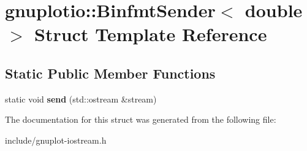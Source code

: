 \hypertarget{structgnuplotio_1_1BinfmtSender_3_01double_01_4}{}\section{gnuplotio\+:\+:Binfmt\+Sender$<$ double $>$ Struct Template Reference}
\label{structgnuplotio_1_1BinfmtSender_3_01double_01_4}
\subsection*{Static Public Member Functions}
\begin{DoxyCompactItemize}
\item 
\mbox{\label{structgnuplotio_1_1BinfmtSender_3_01double_01_4_a455b75492a6a86398374d14a2bfc7238}} 
static void {\bfseries send} (std\+::ostream \&stream)
\end{DoxyCompactItemize}


The documentation for this struct was generated from the following file\+:\begin{DoxyCompactItemize}
\item 
include/gnuplot-\/iostream.\+h\end{DoxyCompactItemize}
